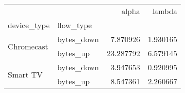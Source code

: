 \begin{tabular}{llrr}
\toprule
 &  & alpha & lambda \\
device_type & flow_type &  &  \\
\midrule
\multirow[t]{2}{*}{Chromecast} & bytes_down & 7.870926 & 1.930165 \\
 & bytes_up & 23.287792 & 6.579145 \\
\cline{1-4}
\multirow[t]{2}{*}{Smart TV} & bytes_down & 3.947653 & 0.920995 \\
 & bytes_up & 8.547361 & 2.260667 \\
\cline{1-4}
\bottomrule
\end{tabular}
